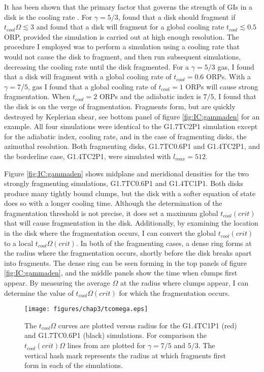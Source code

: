 It has been shown that the primary factor that governs the strength of GIs in a disk is the cooling rate \citep{gammie2001,mejia2005}. For $\gamma = 5/3$, \citet{gammie2001} found that a disk should fragment if $t_{cool}\Omega \lesssim 3$ and \citet{mejia2005} found that a disk will fragment for a global cooling rate $t_{cool} \lesssim 0.5$ ORP, provided the simulation is carried out at high enough resolution. The procedure I employed was to perform a simulation using a cooling rate that would not cause the disk to fragment, and then run subsequent simulations, decreasing the cooling rate until the disk fragmented. For a $\gamma = 5/3$ gas, I found that a disk will fragment with a global cooling rate of $t_{cool} = 0.6$ ORPs. With a $\gamma = 7/5$, gas I found that a global cooling rate of $t_{cool} = 1$ ORPs will cause strong fragmentation. When $t_{cool} = 2$ ORPs and the adiabatic index is $7/5$, I found that the disk is on the verge of fragmentation. Fragments form, but are quickly destroyed by Keplerian shear, see bottom panel of figure \ref{fig:IC:gammaden} for an example. All four simulations were identical to the G1.7TC2P1 simulation except for the adiabatic index, cooling rate, and in the case of fragmenting disks, the azimuthal resolution. Both fragmenting disks, G1.7TC0.6P1 and G1.4TC2P1, and the borderline case, G1.4TC2P1, were simulated with $l_{max} = 512$.

Figure \ref{fig:IC:gammaden} shows midplane and meridional densities for the two strongly fragmenting simulations, G1.7TC0.6P1 and G1.4TC1P1. Both disks produce many tightly bound clumps, but the disk with a softer equation of state does so with a longer cooling time. Although the determination of the fragmentation threshold is not precise, it does set a maximum global $t_{cool}(crit)$ that will cause fragmentation in the disk. Additionally, by examining the location in the disk where the fragmentation occurs, I can convert the global $t_{cool}(crit)$ to a local $t_{cool}\Omega  (crit)$. In both of the fragmenting cases, a dense ring forms at the radius where the fragmentation occurs, shortly before the disk breaks apart into fragments. The dense ring can be seen forming in the top panels of figure \ref{fig:IC:gammaden}, and the middle panels show the time when clumps first appear. By measuring the average $\Omega$ at the radius where clumps appear, I can determine the value of $t_{cool}\Omega (crit)$ for which the fragmentation occurs. 

\begin{figure}[p]
\centering
\texttt{[image: figures/chap3/tcomega.eps]}
\caption[The $t_{cool} \Omega$ curves for fragmenting simulations]{The $t_{cool}\Omega$ curves are plotted versus radius for the G1.4TC1P1 (red) and G1.7TC0.6P1 (black) simulations. For comparison the $t_{cool}(crit)\Omega$ lines from \citet{rice2005} are plotted for $\gamma = 7/5$ and $5/3$. The vertical hash mark represents the radius at which fragments first form in each of the simulations.}
\label{fig:IC:tcomega}
\end{figure}

